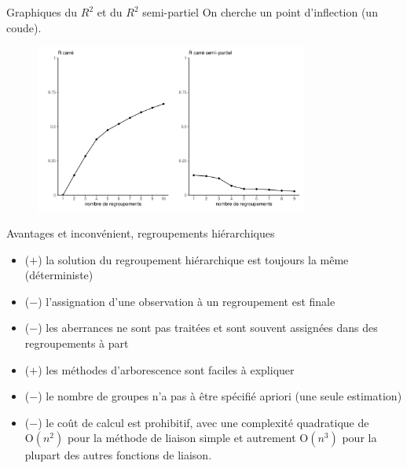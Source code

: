 \documentclass[
  ignorenonframetext,
]{beamer}
\providecommand{\tightlist}{%
  \setlength{\itemsep}{0pt}\setlength{\parskip}{0pt}}\usepackage{longtable,booktabs,array}
\begin{document}
\begin{frame}{Graphiques du \(R^2\) et du \(R^2\) semi-partiel}
\protect\hypertarget{graphiques-du-r2-et-du-r2-semi-partiel}{}
On cherche un point d'inflection (un coude).

\begin{figure}

{\centering \includegraphics[width=0.8\textwidth,height=\textheight]{MATH60602-diapos12_files/figure-beamer/unnamed-chunk-15-1.pdf}

}

\end{figure}
\end{frame}

\begin{frame}{Avantages et inconvénient, regroupements hiérarchiques}
\protect\hypertarget{avantages-et-inconvuxe9nient-regroupements-hiuxe9rarchiques}{}
\begin{itemize}
\tightlist
\item
  (\(+\)) la solution du regroupement hiérarchique est toujours la même
  (déterministe)
\item
  (\(-\)) l'assignation d'une observation à un regroupement est finale
\item
  (\(-\)) les aberrances ne sont pas traitées et sont souvent assignées
  dans des regroupements à part
\item
  (\(+\)) les méthodes d'arborescence sont faciles à expliquer
\item
  (\(-\)) le nombre de groupes n'a pas à être spécifié apriori (une
  seule estimation)
\item
  (\(-\)) le coût de calcul est prohibitif, avec une complexité
  quadratique de \(\mathrm{O}(n^2)\) pour la méthode de liaison simple
  et autrement \(\mathrm{O}(n^3)\) pour la plupart des autres fonctions
  de liaison.
\end{itemize}
\end{frame}
\end{document}
